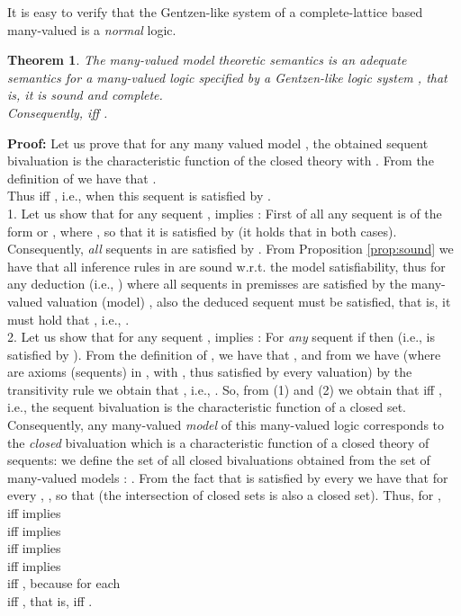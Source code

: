 \documentclass[10pt,twocolumn]{article}
\newtheorem{theo}{Theorem}
\begin{document}
It is easy to verify that the Gentzen-like system  of a complete-lattice based many-valued
 is a \emph{normal} logic.
\begin{theo}   \label{prop:manyvaluation}
The many-valued model theoretic semantics is an adequate semantics
for a many-valued logic  specified by a Gentzen-like logic
system , that is, it is sound and complete. \\Consequently,
 iff .
\end{theo}
\textbf{Proof:} Let us prove that for any many valued model , the obtained sequent bivaluation  is the
characteristic function of the closed theory 
with . From the definition of  we have that
.\\
Thus  iff , i.e., when this sequent is satisfied by .\\
1. Let us show that for any sequent ,  implies
: First of all any sequent  is of the form
 or , where , so
that it is satisfied by  (it holds that  in both cases). Consequently,
\emph{all} sequents in  are satisfied by . From Proposition
\ref{prop:sound} we have that all inference rules in  are sound
w.r.t. the model satisfiability, thus for any deduction 
(i.e., ) where all sequents in premisses are
satisfied by the many-valued valuation (model) , also the deduced
sequent 
must be satisfied, that is, it must hold that , i.e., .\\
2. Let us show that for any sequent ,   implies
:
 For \emph{any} sequent  if  then 
 (i.e.,  is satisfied by ).
From the definition of , we have that , and from  we have   (where  are axioms (sequents) in , with ,
 thus satisfied by every valuation) by the transitivity rule we obtain that ,
 i.e., .
So, from (1) and (2) we obtain that  iff , i.e., the sequent bivaluation 
 is the characteristic function of a closed set.
  Consequently, any many-valued \emph{model}  of this many-valued logic 
corresponds to the \emph{closed} bivaluation  which is a
characteristic function of a closed theory of sequents:  we define
the set of all closed bivaluations obtained from the set of
many-valued models : . From the fact that 
is satisfied by every  we have that for every
, , so that
 (the intersection of closed sets
is also a closed set).
 Thus, for ,
\\ iff  implies \\
 iff  implies \\
 iff  implies \\
 iff  implies   \\
 iff  ,  because  for each  \\
 iff , that is,  iff .
\end{document}
